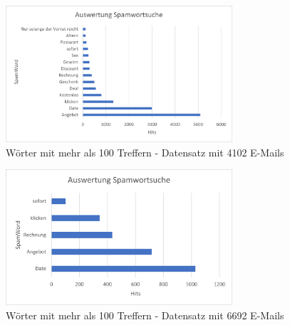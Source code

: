 \begin{figure}[!ht]
    \centering
    \includegraphics[width=0.75\textwidth]{images/Auswertung_Spamwortsuche.png}
    \caption{Wörter mit mehr als 100 Treffern - Datensatz mit 4102 E-Mails} 
    \label{fig:spamwortlistegreater100}
\end{figure}


\begin{figure}[!ht]
    \centering
    \includegraphics[width=0.75\textwidth]{images/Merged_Auswertung_Spamwortsuche.png}
    \caption{Wörter mit mehr als 100 Treffern - Datensatz mit 6692 E-Mails} 
    \label{fig:spamwortlistegreater100merged}
\end{figure}

\newpage